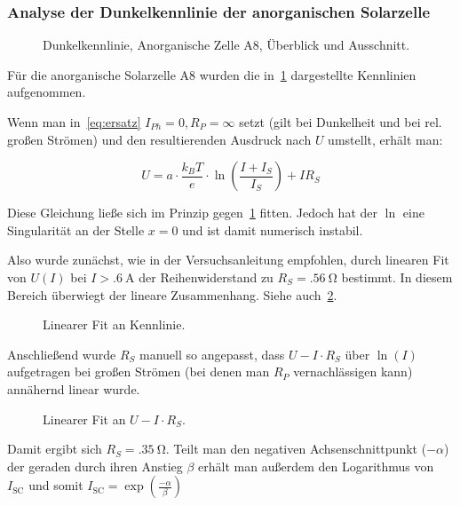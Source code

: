 \documentclass[slug=SZ, room=Hermann-Krone-Bau\,\ Labor\ 1.25,
supervisor=Martin\ Kroll, coursedate=14.\ 11.\ 2019]{../../Lab_Report_LaTeX/lab_report}
\newcommand{\isc}{I_{\text{SC}}}
\begin{document}
\subsubsection{Analyse der Dunkelkennlinie der anorganischen
  Solarzelle}
\label{sec:anordunkel}
\begin{figure}[H]\centering
  
  
  \caption{Dunkelkennlinie, Anorganische Zelle A8, \"Uberblick und Ausschnitt.}
  \label{fig:a-anorg-dunkel}
\end{figure}

F\"ur die anorganische Solarzelle A8 wurden die
in~\ref{fig:a-anorg-dunkel} dargestellte Kennlinien aufgenommen.

Wenn man in~\eqref{eq:ersatz} \(I_{Ph}=0, R_{P}=\infty\) setzt (gilt bei
Dunkelheit und bei rel. gro\ss{}en Str\"omen) und den resultierenden Ausdruck
nach \(U\) umstellt, erh\"alt man:

\begin{equation}
  \label{eq:uofi}
  U=a\cdot\frac{k_BT}{e}\cdot\ln(\frac{I+I_S}{I_S})+IR_S
\end{equation}


Diese Gleichung ließe sich im Prinzip gegen~\ref{fig:a-anorg-dunkel}
fitten. Jedoch hat der \(\ln\) eine Singularit\"at an der Stelle
\(x=0\) und ist damit numerisch instabil.

Also wurde zun\"achst, wie in der Versuchsanleitung empfohlen, durch
linearen Fit von \(U(I)\) bei \(I>\SI{.6}{\ampere}\) der
Reihenwiderstand zu \(R_S=\SI{.56}{\ohm}\) bestimmt. In diesem Bereich
\"uberwiegt der lineare Zusammenhang. Siehe
auch~\ref{fig:a-anorg-lin}.

\begin{figure}[H]\centering
  
  \caption{Linearer Fit an Kennlinie.}
  \label{fig:a-anorg-lin}
\end{figure}

Anschließend wurde \(R_S\) manuell so angepasst, dass \(U-I\cdot
R_S\) \"uber \(\ln(I)\) aufgetragen bei gro\ss{}en Str\"omen (bei
denen man \(R_P\) vernachl\"assigen kann) ann\"ahernd linear wurde.

\begin{figure}[H]\centering
  
  \caption{Linearer Fit an \(U-I\cdot R_S\).}
  \label{fig:a-anorg-lin-log}
\end{figure}

Damit ergibt sich \(R_S=\SI{.35}{\ohm}\). Teilt man den negativen
Achsenschnittpunkt (\(-\alpha\)) der geraden durch ihren Anstieg \(\beta\) erhält man
au\ss{}erdem den Logarithmus von \(\isc\) und somit \(\isc=\exp(\frac{-\alpha}{\beta})\)
\end{document}

